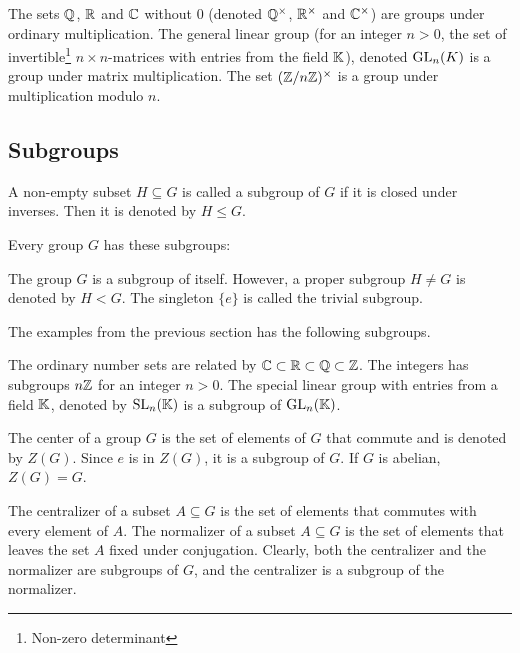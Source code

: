 \begin{example}
The sets $\mathbb{Q}$, $\mathbb{R}$ and $\mathbb{C}$ without $0$ (denoted $\mathbb{Q}^{\times}$, $\mathbb{R}^{\times}$ and $\mathbb{C}^{\times}$) are  groups under ordinary multiplication. %
The general linear group (for an integer $n>0$, the set of invertible\footnote{Non-zero determinant} $n \times n$-matrices with entries from the field $\mathbb{K}$), denoted $\text{GL}_n(K)$ is a group under matrix multiplication. 
The set $(\mathbb{Z}/n\mathbb{Z})^{\times}$ is a group under multiplication modulo $n$.
\end{example}

\subsection{Subgroups}

\begin{definition}[Subgroup]
A non-empty subset $H \subseteq G$ is called a subgroup of $G$ if it is closed under inverses. Then it is denoted by $H \leq G$.
\end{definition}

Every group $G$ has these subgroups:

\begin{example}
The group $G$ is a subgroup of itself. However, a proper subgroup $H \neq G$ is denoted by $H < G$. The singleton $\{e\}$ is called the trivial subgroup.
\end{example}

The examples from the previous section has the following subgroups.

\begin{example}
The ordinary number sets are related by $\mathbb{C} \subset \mathbb{R} \subset \mathbb{Q} \subset \mathbb{Z}$. The integers has subgroups $n\mathbb{Z}$ for an integer $n>0$. The special linear group with entries from a field $\mathbb{K}$, denoted by $\text{SL}_n(\mathbb{K})$ is a subgroup of $\text{GL}_n(\mathbb{K})$.
\end{example}

\begin{example}[Center]
The center of a group $G$ is the set of elements of $G$ that commute and is denoted by $Z(G)$. Since $e$ is in $Z(G)$, it is a subgroup of $G$. If $G$ is abelian, $Z(G) = G$.	
\end{example}

\begin{example}
The centralizer of a subset $A \subseteq G$ is the set of elements that commutes with every element of $A$.
The normalizer of a subset $A \subseteq G$ is the set of elements that leaves the set $A$ fixed  under conjugation. Clearly, both the centralizer and the normalizer are subgroups of $G$, and the centralizer is a subgroup of the normalizer.
\end{example}

